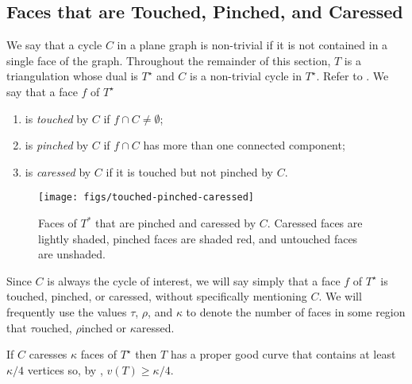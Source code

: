 \documentclass{patmorin}
\newcommand{\dual}[1]{{#1}^\star}
\begin{document}
\subsection{Faces that are Touched, Pinched, and Caressed}

We say that a cycle $C$ in a plane graph is non-trivial if it is not
contained in a single face of the graph.  Throughout the remainder of
this section, $T$ is a triangulation whose dual is $\dual{T}$ and $C$
is a non-trivial cycle in $\dual{T}$.  Refer to .
We say that a face $f$ of $\dual{T}$ 
\begin{enumerate}
  \item is \emph{touched} by $C$ if $f\cap C\neq \emptyset$;
  \item is \emph{pinched} by $C$ if $f\cap C$ has more than one connected component;
  \item is \emph{caressed} by $C$ if it is touched but not pinched by $C$.
\end{enumerate}

\begin{figure}
\begin{center}
	  \texttt{[image: figs/touched-pinched-caressed]}
\end{center}
	  \caption{Faces of $T^*$ that are pinched and caressed by $C$. Caressed faces are lightly shaded, pinched faces are shaded red, and untouched faces are unshaded.}
\end{figure}


Since $C$ is always the cycle of interest, we will say simply that a face
$f$ of $\dual{T}$ is touched, pinched, or caressed, without specifically
mentioning $C$.  We will frequently use the values $\tau$, $\rho$, and
$\kappa$ to denote the number of faces in some region that $\tau$ouched,
$\rho$inched or $\kappa$aressed.

\begin{lem}
   If $C$ caresses $\kappa$ faces of $\dual{T}$ then $T$ has a proper good
	curve that contains at least $\kappa/4$ vertices so, by , $v(T)\ge \kappa/4$.
\end{lem}
\end{document}

